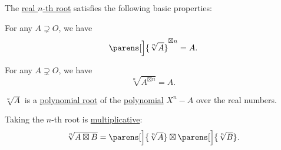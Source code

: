 \begin{proposition}\label{thm:def:real_nth_root}
  The \hyperref[def:real_nth_root]{real \( n \)-th root} satisfies the following basic properties:
  \begin{thmenum}
     For any \( A \supsetneq O \), we have
    \begin{equation}\label{eq:thm:def:real_nth_root/power_of_root}
      \parens[\Big]{ \sqrt[n]{ A } }^{\boxtimes n} = A.
    \end{equation}

     For any \( A \supsetneq O \), we have
    \begin{equation}\label{eq:thm:def:real_nth_root/root_of_power}
      \sqrt[n]{ A^{\boxtimes n} } = A.
    \end{equation}

     \( \sqrt[n]{ A } \) is a \hyperref[def:multiple_root]{polynomial root} of the \hyperref[def:polynomial_algebra/polynomials]{polynomial} \( X^n - A \) over the real numbers.

     Taking the \( n \)-th root is \hyperref[def:multiplicative_function]{multiplicative}:
    \begin{equation}\label{eq:thm:def:real_nth_root/multiplicative}
      \sqrt[n]{ A \boxtimes B } = \parens[\Big]{\sqrt[n]{ A }} \boxtimes \parens[\Big]{\sqrt[n]{ B }}.
    \end{equation}
  \end{thmenum}
\end{proposition}
